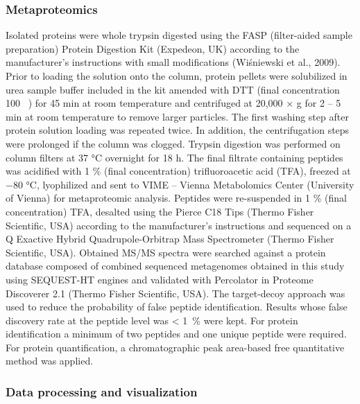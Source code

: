 \documentclass[12pt,]{article}
\begin{document}
\hypertarget{metaproteomics}{%
\subsubsection{Metaproteomics}\label{metaproteomics}}

Isolated proteins were whole trypsin digested using the FASP
(filter-aided sample preparation) Protein Digestion Kit (Expedeon, UK)
according to the manufacturer's instructions with small modifications
(Wiśniewski et al., 2009). Prior to loading the solution onto the
column, protein pellets were solubilized in urea sample buffer included
in the kit amended with DTT (final concentration 100 \si{\milli\Molar})
for 45 \si{\minute} at room temperature and centrifuged at 20,000 × g
for 2 -- 5 \si{\minute} at room temperature to remove larger particles.
The first washing step after protein solution loading was repeated
twice. In addition, the centrifugation steps were prolonged if the
column was clogged. Trypsin digestion was performed on column filters at
37 \si{\degreeCelsius} overnight for 18 \si{\hour}. The final filtrate
containing peptides was acidified with 1 \si{\percent} (final
concentration) trifluoroacetic acid (TFA), freezed at \num{-80}
\si{\degreeCelsius}, lyophilized and sent to VIME -- Vienna Metabolomics
Center (University of Vienna) for metaproteomic analysis. Peptides were
re-suspended in 1 \si{\percent} (final concentration) TFA, desalted
using the Pierce C18 Tips (Thermo Fisher Scientific, USA) according to
the manufacturer's instructions and sequenced on a Q Exactive Hybrid
Quadrupole-Orbitrap Mass Spectrometer (Thermo Fisher Scientific, USA).
Obtained MS/MS spectra were searched against a protein database composed
of combined sequenced metagenomes obtained in this study using
SEQUEST-HT engines and validated with Percolator in Proteome Discoverer
2.1 (Thermo Fisher Scientific, USA). The target-decoy approach was used
to reduce the probability of false peptide identification. Results whose
false discovery rate at the peptide level was \textless{}
\SI{1}{\percent} were kept. For protein identification a minimum of two
peptides and one unique peptide were required. For protein
quantification, a chromatographic peak area-based free quantitative
method was applied.

\hypertarget{data-processing-and-visualization}{%
\subsubsection{Data processing and
visualization}\label{data-processing-and-visualization}}
\end{document}
